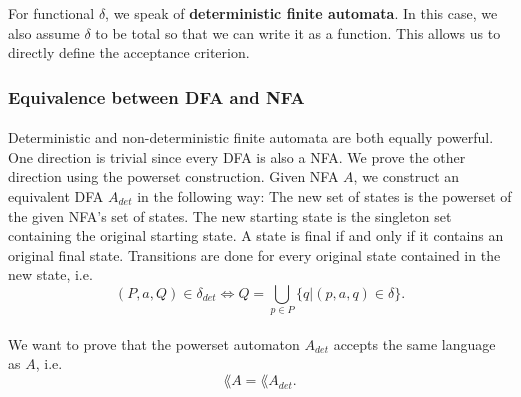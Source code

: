 \documentclass[11pt,a4paper,oneside]{book}
\begin{document}

                For functional $\delta$, we speak of \textbf{deterministic finite automata}. In this case, we also assume $\delta$ to be total so that we can write it as a function. 
                This allows us to directly define the acceptance criterion. 


                \subsubsection{Equivalence between DFA and NFA}
                    \paragraph{} 
                        Deterministic and non-deterministic finite automata are both equally powerful. 
                        One direction is trivial since every DFA is also a NFA. 
                        We prove the other direction using the powerset construction. 
                        Given NFA $A$, we construct an equivalent DFA $A_{det}$ in the following way:
                        The new set of states is the powerset of the given NFA's set of states. 
                        The new starting state is the singleton set containing the original starting state. 
                        A state is final if and only if it contains an original final state. 
                        Transitions are done for every original state contained in the new state, i.e. 
                        \[
                            (P, a, Q) \in \delta_{det} \Longleftrightarrow Q = \bigcup \limits _{p \in P} \{ q | (p,a,q) \in \delta \}.
                        \]


                    \vspace{-0.4cm}
                    \vspace{-0.4cm}

                    \paragraph{}
                        We want to prove that the powerset automaton $A_{det}$ accepts the same language as $A$, i.e.
                        \[
                            \lang{A} = \lang{A_{det}}.
                        \]
\end{document}
